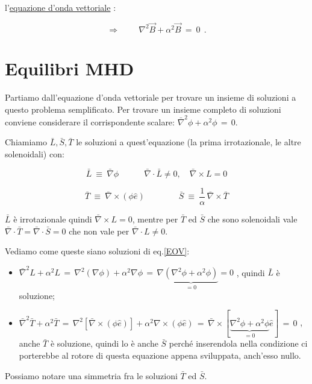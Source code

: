 l'\underline{equazione d'onda vettoriale} :

\begin{equation} \label{EOV}
	\Rightarrow\ \qquad \nabla^2 \vec B + \alpha^2 \vec B \ =\ 0\ \ .
\end{equation}

%
%
%
\section{Equilibri MHD}

Partiamo dall'equazione d'onda vettoriale per trovare un insieme di soluzioni a questo problema semplificato.
Per trovare un insieme completo di soluzioni conviene considerare il corrispondente scalare:  $\bar\nabla^2 \phi + \alpha^2 \phi\, =\, 0$.

Chiamiamo $\bar L, \bar S,\bar T$ le soluzioni a quest'equazione (la prima irrotazionale, le altre solenoidali) con:

\[\boxed{\bar L\ \equiv\ \bar \nabla \phi}
\quad \qquad \bar\nabla \cdot\bar L \neq 0,\quad \bar \nabla \times L = 0\]

\[\boxed{\bar T\ \equiv\ \bar \nabla \times (\phi \hat e)}
\qquad \qquad
\boxed{ \bar S\ \equiv\ \frac{1}{\alpha}\, \bar \nabla \times \bar T }
\] 

$\bar L$ è irrotazionale quindi $\bar \nabla \times L = 0$, mentre per $\bar T$ ed $\bar S$ che sono solenoidali vale $\bar\nabla \cdot\bar T = \bar \nabla \cdot \bar S = 0$ che non vale per $\bar \nabla \cdot L \neq 0$.

Vediamo come queste siano soluzioni di eq.\ref{EOV}:

\begin{itemize}
	\item $\bar \nabla^2 L + \alpha^2 L\, =\, \nabla^2(\nabla \phi)+\alpha^2\nabla \phi\, =\, \nabla\underset{=0}{\underbrace{(\nabla^2 \phi + \alpha^2 \phi)}}=0$ , quindi $\bar L$ è soluzione;
	\item $\bar \nabla^2 \bar T + \alpha^2 \bar T\, =\, \nabla^2 [\bar \nabla \times (\phi \hat e)]+\alpha^2 \nabla \times (\phi \hat e)\,=\, \bar \nabla \times [\underset{=0}{\underbrace{\nabla^2 \phi + \alpha^2 \phi}}\hat e]\, =\, 0$ , anche $\bar T$ è soluzione, quindi lo è anche $\bar S$ perché inserendola nella condizione ci porterebbe al rotore di questa equazione appena sviluppata, anch'esso nullo.
\end{itemize}

Possiamo notare una simmetria fra le soluzioni $\bar T$ ed $\bar S$.

